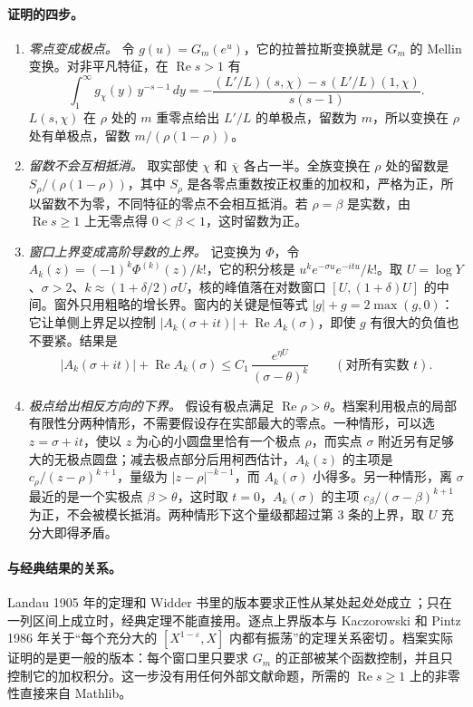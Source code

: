 \documentclass[11pt]{article}
\renewcommand{\Re}{\operatorname{Re}}
\begin{document}
\paragraph{证明的四步。}
\begin{enumerate}
\item \emph{零点变成极点。} 令 $g(u)=G_m(e^u)$，它的拉普拉斯变换就是 $G_m$ 的 Mellin 变换。对非平凡特征，在 $\Re s>1$ 有
\[
\int_1^\infty g_\chi(y)\,y^{-s-1}\,dy=-\frac{(L'/L)(s,\chi)-s\,(L'/L)(1,\chi)}{s(s-1)} .
\]
$L(s,\chi)$ 在 $\rho$ 处的 $m$ 重零点给出 $L'/L$ 的单极点，留数为 $m$，所以变换在 $\rho$ 处有单极点，留数 $m/(\rho(1-\rho))$。
\item \emph{留数不会互相抵消。} 取实部使 $\chi$ 和 $\overline\chi$ 各占一半。全族变换在 $\rho$ 处的留数是 $S_\rho/(\rho(1-\rho))$，其中 $S_\rho$ 是各零点重数按正权重的加权和，严格为正，所以留数不为零，不同特征的零点不会相互抵消。若 $\rho=\beta$ 是实数，由 $\Re s\ge1$ 上无零点得 $0<\beta<1$，这时留数为正。
\item \emph{窗口上界变成高阶导数的上界。} 记变换为 $\Phi$，令 $A_k(z)=(-1)^k\Phi^{(k)}(z)/k!$，它的积分核是 $u^ke^{-\sigma u}e^{-itu}/k!$。取 $U=\log Y$、$\sigma>2$、$k\approx(1+\delta/2)\sigma U$，核的峰值落在对数窗口 $[U,(1+\delta)U]$ 的中间。窗外只用粗略的增长界。窗内的关键是恒等式 $|g|+g=2\max(g,0)$：它让单侧上界足以控制 $|A_k(\sigma+it)|+\Re A_k(\sigma)$，即使 $g$ 有很大的负值也不要紧。结果是
\[
|A_k(\sigma+it)|+\Re A_k(\sigma)\le C_1\,\frac{e^{\eta U}}{(\sigma-\theta)^k}\qquad(\text{对所有实数 } t).
\]
\item \emph{极点给出相反方向的下界。} 假设有极点满足 $\Re\rho>\theta$。档案利用极点的局部有限性分两种情形，不需要假设存在实部最大的零点。一种情形，可以选 $z=\sigma+it$，使以 $z$ 为心的小圆盘里恰有一个极点 $\rho$，而实点 $\sigma$ 附近另有足够大的无极点圆盘；减去极点部分后用柯西估计，$A_k(z)$ 的主项是 $c_\rho/(z-\rho)^{k+1}$，量级为 $|z-\rho|^{-k-1}$，而 $A_k(\sigma)$ 小得多。另一种情形，离 $\sigma$ 最近的是一个实极点 $\beta>\theta$，这时取 $t=0$，$A_k(\sigma)$ 的主项 $c_\beta/(\sigma-\beta)^{k+1}$ 为正，不会被模长抵消。两种情形下这个量级都超过第 3 条的上界，取 $U$ 充分大即得矛盾。
\end{enumerate}

\paragraph{与经典结果的关系。} Landau 1905 年的定理和 Widder 书里的版本要求正性从某处起\emph{处处}成立\,\cite{landau,widder}；只在一列区间上成立时，经典定理不能直接用。逐点上界版本与 Kaczorowski 和 Pintz 1986 年关于“每个充分大的 $[X^{1-\varepsilon},X]$ 内都有振荡”的定理关系密切\,\cite{kp}。档案实际证明的是更一般的版本：每个窗口里只要求 $G_m$ 的正部被某个函数控制，并且只控制它的加权积分。这一步没有用任何外部文献命题，所需的 $\Re s\ge1$ 上的非零性直接来自 Mathlib。
\end{document}

